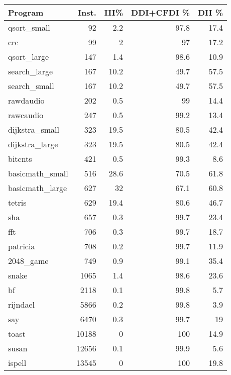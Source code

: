 \begin{tabular}{lrrrr}
\hline
 Program         &   Inst. &   III\% &   DDI+CFDI \% &   DII \% \\
\hline
 qsort\_small     &      92 &    2.2 &         97.8 &    17.4 \\
 crc             &      99 &    2   &         97   &    17.2 \\
 qsort\_large     &     147 &    1.4 &         98.6 &    10.9 \\
 search\_large    &     167 &   10.2 &         49.7 &    57.5 \\
 search\_small    &     167 &   10.2 &         49.7 &    57.5 \\
 rawdaudio       &     202 &    0.5 &         99   &    14.4 \\
 rawcaudio       &     247 &    0.5 &         99.2 &    13.4 \\
 dijkstra\_small  &     323 &   19.5 &         80.5 &    42.4 \\
 dijkstra\_large  &     323 &   19.5 &         80.5 &    42.4 \\
 bitcnts         &     421 &    0.5 &         99.3 &     8.6 \\
 basicmath\_small &     516 &   28.6 &         70.5 &    61.8 \\
 basicmath\_large &     627 &   32   &         67.1 &    60.8 \\
 tetris          &     629 &   19.4 &         80.6 &    46.7 \\
 sha             &     657 &    0.3 &         99.7 &    23.4 \\
 fft             &     706 &    0.3 &         99.7 &    18.7 \\
 patricia        &     708 &    0.2 &         99.7 &    11.9 \\
 2048\_game       &     749 &    0.9 &         99.1 &    35.4 \\
 snake           &    1065 &    1.4 &         98.6 &    23.6 \\
 bf              &    2118 &    0.1 &         99.8 &     5.7 \\
 rijndael        &    5866 &    0.2 &         99.8 &     3.9 \\
 say             &    6470 &    0.3 &         99.7 &    19   \\
 toast           &   10188 &    0   &        100   &    14.9 \\
 susan           &   12656 &    0.1 &         99.9 &     5.6 \\
 ispell          &   13545 &    0   &        100   &    19.8 \\

\end{tabular}
